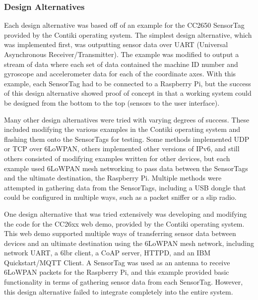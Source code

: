 \documentclass[PPFS.tex]{template/subfiles}
\begin{document}
\subsubsection{Design Alternatives}
Each design alternative was based off of an example for the CC2650 SensorTag provided by the Contiki operating system. The simplest design alternative, which was implemented first, was outputting sensor data over UART (Universal Asynchronous Receiver/Transmitter). The example was modified to output a stream of data where each set of data contained the machine ID number and gyroscope and accelerometer data for each of the coordinate axes. With this example, each SensorTag had to be connected to a Raspberry Pi, but the success of this design alternative showed proof of concept in that a working system could be designed from the bottom to the top (sensors to the user interface).

Many other design alternatives were tried with varying degrees of success. These included modifying the various examples in the Contiki operating system and flashing them onto the SensorTags for testing. Some methods implemented UDP or TCP over 6LoWPAN, others implemented other versions of IPv6, and still others consisted of modifying examples written for other devices, but each example used 6LoWPAN mesh networking to pass data between the SensorTags and the ultimate destination, the Raspberry Pi. Multiple methods were attempted in gathering data from the SensorTags, including a USB dongle that could be configured in multiple ways, such as a packet sniffer or a slip radio.

One design alternative that was tried extensively was developing and modifying the code for the CC26xx web demo, provided by the Contiki operating system. This web demo supported multiple ways of transferring sensor data between devices and an ultimate destination using the 6LoWPAN mesh network, including network UART, a 6lbr client, a CoAP server, HTTPD, and an IBM Quickstart/MQTT Client. A SensorTag was used as an antenna to receive 6LoWPAN packets for the Raspberry Pi, and this example provided basic functionality in terms of gathering sensor data from each SensorTag. However, this design alternative failed to integrate completely into the entire system.
\end{document}

